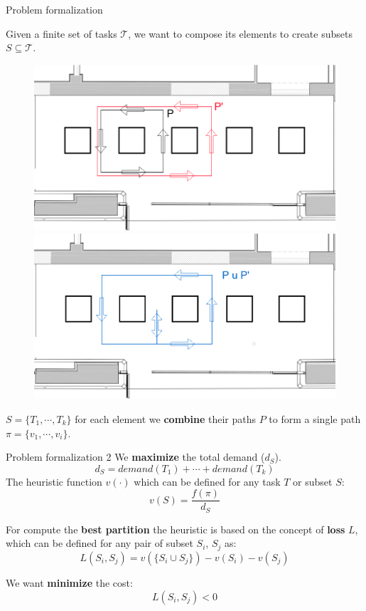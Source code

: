     \begin{frame}[fragile]{Problem formalization}
        
        Given a finite set of tasks $\mathcal{T}$, we want to compose its elements to 
        create subsets $S\subseteq\mathcal{T}$.

        \begin{figure}
            
            \includegraphics[scale=0.18]{img/p1p2_cut.png}
            \includegraphics[scale=0.18]{img/p3_cut.png}
            
        \end{figure}
        $S = \{T_1,\cdots,T_k\}$ for each element we {\bf combine} their paths $P$ to form
        a single path $\pi = \{v_1,\cdots,v_i\}$.
    \end{frame}

    \begin{frame}[fragile]{Problem formalization 2}
       We {\bf maximize} the total demand ($d_S$).
        \[d_S =demand(T_1) + \cdots + demand(T_k)\]
        The heuristic function $v(\cdot)$ which
        can be defined for any task $T$ or subset $S$:
        \[ v(S) = \frac{f(\pi)}{d_S}\]

        For compute the {\bf best partition} the heuristic is based on the concept of {\bf loss} $L$,
        which can be defined for any pair of subset $S_i$, $S_j$ as:
        \[L(S_i,S_j) = v(\{ S_i \cup S_j\}) - v(S_i) - v(S_j)\]

        We want {\bf minimize} the cost:
        \[L(S_i,S_j) < 0 \]
    \end{frame}

